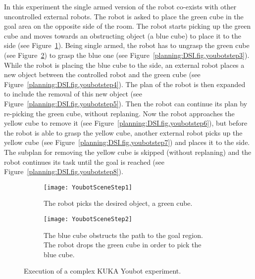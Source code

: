 {\vspace*{\fill}

\clearpage
\begin{experiment}
In this experiment the single armed version of the robot co-exists with other uncontrolled external robots. The robot is asked to place the green cube in the goal area on the opposite side of the room. The robot starts picking up the green cube and moves towards an obstructing object (a blue cube) to place it to the side (see Figure~\ref{planning:DSI.fig.youbotstep1}). Being single armed, the robot has to ungrasp the green cube (see Figure~\ref{planning:DSI.fig.youbotstep2}) to grasp the blue one (see Figure~\ref{planning:DSI.fig.youbotstep3}). While the robot is placing the blue cube to the side, an external robot places a new object between the controlled robot and the green cube (see Figure~\ref{planning:DSI.fig.youbotstep4}). The plan of the robot is then expanded to include the removal of this new object (see Figure~\ref{planning:DSI.fig.youbotstep5}). Then the robot can continue its plan by re-picking the green cube, without replaning. Now the robot approaches the yellow cube to remove it (see Figure~\ref{planning:DSI.fig.youbotstep6}), but before the robot is able to grasp the yellow cube, another external robot picks up the yellow cube (see Figure~\ref{planning:DSI.fig.youbotstep7}) and places it to the side. The subplan for removing the yellow cube is skipped (without replaning) and the robot  continues its task until the goal is reached (see Figure~\ref{planning:DSI.fig.youbotstep8}).	
\end{experiment}

\begin{figure}[h]
        \centering
        \begin{subfigure}[b]{1\columnwidth}
                \centering
                \texttt{[image: YoubotSceneStep1]}
                \caption{The robot picks the desired object, a green cube.}
                \label{planning:DSI.fig.youbotstep1}              
        \end{subfigure}       
               
        \begin{subfigure}[b]{1\columnwidth}
                \centering
                \texttt{[image: YoubotSceneStep2]}
                \caption{The blue cube obstructs the path to the goal region. The robot drops the green cube in order to pick the blue cube.}
 			\label{planning:DSI.fig.youbotstep2}  
         \end{subfigure}
        \caption{Execution of a complex KUKA Youbot experiment.}
        \label{planning:DSI.fig.youscreen}
\end{figure}
\clearpage

}
